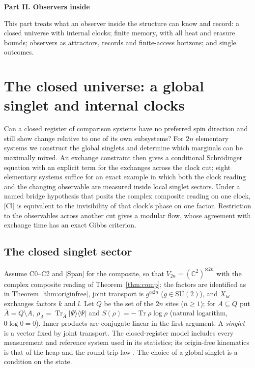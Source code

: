 \documentclass[aps,pra,onecolumn,superscriptaddress,nofootinbib,10pt]{revtex4-2}
\theoremstyle{definition}
\theoremstyle{remark}
\newcommand{\C}{\mathbb{C}}
\newcommand{\tr}{\operatorname{Tr}}
\newcommand{\SU}{\mathrm{SU}}
\newcommand{\paperpart}[1]{\par\bigskip\begin{center}\large\bfseries #1\end{center}\par\medskip}
\begin{document}
\paperpart{Part II.  Observers inside}
\noindent This part treats what an observer inside the structure can know and record: a closed universe with
internal clocks; finite memory, with all heat and erasure bounds; observers as attractors, records and
finite-access horizons; and single outcomes.

\section{The closed universe: a global singlet and internal clocks}\label{sec:closedreg}
Can a closed register of comparison systems have no preferred spin direction and still show change
relative to one of its own subsystems?  For $2n$ elementary systems we construct the global singlets and
determine which marginals can be maximally mixed.  An exchange constraint then gives a conditional
Schr\"odinger equation with an explicit term for the exchanges across the clock cut; eight elementary
systems suffice for an exact example in which both the clock reading and the changing observable are
measured inside local singlet sectors.  Under a named bridge hypothesis that posits the complex composite
reading on one clock, [Cl] is equivalent to the invisibility of that clock's phase on one factor.  Restriction to the observables across another cut gives a modular flow, whose
agreement with exchange time has an exact Gibbs criterion.

\subsection{The closed singlet sector}\label{sec:cusinglet}
Assume C0--C2 and [Span] for the composite, so that $V_{2n}=(\C^2)^{\otimes2n}$ with the complex composite reading of
Theorem~\ref{thm:comp}; the factors are identified as in Theorem~\ref{thm:originfree}, joint transport is $g^{\otimes2n}$
($g\in\SU(2)$), and $X_{kl}$ exchanges factors $k$ and $l$.  Let $Q$ be the set of the $2n$ sites ($n\ge1$); for $A\subseteq Q$
put $\bar A=Q\setminus A$, $\rho_A=\tr_{\bar A}\lvert\Psi\rangle\langle\Psi\rvert$ and $S(\rho)=-\tr\rho\log\rho$ (natural logarithm, $0\log0=0$).  Inner
products are conjugate-linear in the first argument.  A \emph{singlet} is a vector fixed by joint transport.
The closed-register model includes every measurement and reference system used in its statistics; its
origin-free kinematics is that of the heap and the round-trip law \cite[Def.~2.3, Thm.~3.1]{PaperI}.
The choice of a global singlet is a condition on the state.
\end{document}
